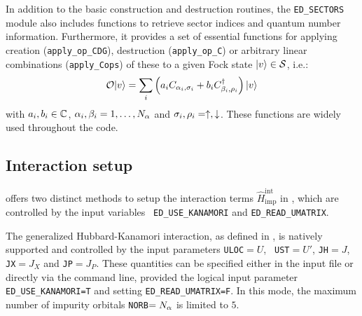 \documentclass[edipack_sp.tex]{subfiles}
\begin{document}
   



In addition to the basic construction and destruction routines, the
{\tt ED\_SECTORS} module also includes functions to
retrieve sector indices and quantum number
information. Furthermore, it provides a set of
essential functions for applying creation ({\tt apply\_op\_CDG}), destruction ({\tt apply\_op\_C}) or arbitrary linear combinations
({\tt apply\_Cops}) of these to a given Fock state $|v\rangle\in{\cal S}$, i.e.:
$$
{\cal O}|v\rangle = \sum_i \left( a_i C_{\alpha_i,\sigma_i}+ b_i C^{\dagger}_{\beta_i,\rho_i}\right)|v\rangle
$$ 
with $a_i, b_i \in\mathbb{C}$, $\alpha_i,\beta_i=1,\dots,N_\alpha$ and $\sigma_i,\rho_i=\uparrow,\downarrow$. These functions are widely used throughout the code. 





















\subsection{Interaction setup}\label{sSecIntSetup}
\NAME offers two distinct methods to setup the interaction terms $\hat{H}^\mathrm{int}_\mathrm{imp}$ in , which are controlled by the input variables {\tt
  ED\_USE\_KANAMORI} and {\tt ED\_READ\_UMATRIX}. 
  
The generalized Hubbard-Kanamori interaction, as defined in , is natively
supported and controlled by the input parameters {\tt ULOC}$=U$, {\tt
  UST}$=U'$, {\tt JH}$=J$, {\tt JX}$=J_{X}$ and {\tt JP}$=J_{P}$.
These quantities can be specified either in the input file or directly
via the command line, provided the logical input parameter {\tt ED\_USE\_KANAMORI=T} and setting {\tt ED\_READ\_UMATRIX=F}. In this mode, the maximum number of impurity orbitals {\tt NORB}$=N_\alpha$ is limited to $5$.
\end{document}
